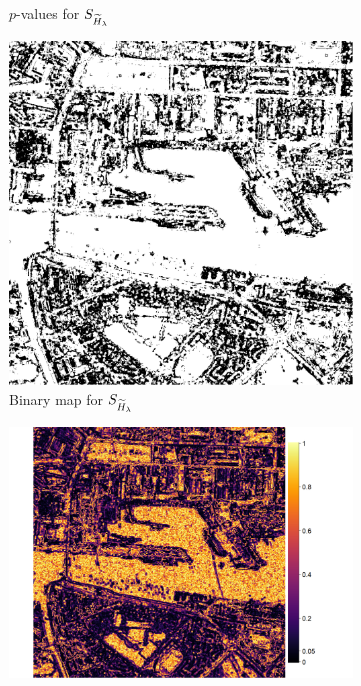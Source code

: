 \documentclass[
  journal,
]{IEEEtran}%
\begin{document}
\begin{figure}[hbt]
\begin{subfigure}{0.22\textwidth}
        \caption{$p$-values for $\small{S_{\widetilde{H}_{\lambda}}}$}
        \label{fig:3b}
    \end{subfigure}
    \begin{subfigure}{0.16\textwidth}
        \includegraphics[width=\linewidth]{./Figures/H_005_dublin_renyi_09_w7_b100.png}
        \caption{Binary map for $\small{S_{\widetilde{H}_{\lambda}}}$}
        \label{fig:3c}
    \end{subfigure}
    \begin{subfigure}{0.22\textwidth}
        \includegraphics[width=\linewidth]{./Figures/AO_w7_L16_b100.png}

\end{subfigure}
\end{figure}
\end{document}
